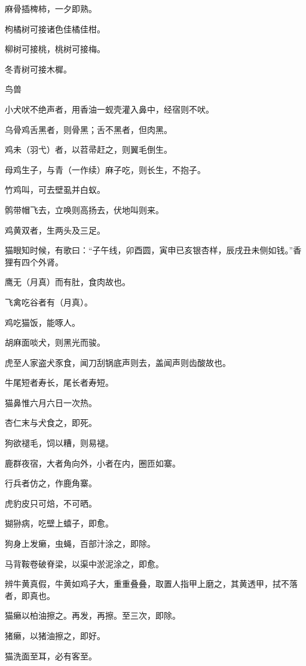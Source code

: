\documentclass[a4paper,12pt,UTF8,twoside]{ctexbook}
\begin{document}
    麻骨插椑柿，一夕即熟。
    
    枸橘树可接诸色佳橘佳柑。
    
    柳树可接桃，桃树可接梅。
    
    冬青树可接木樨。
    
    鸟兽
    
    小犬吠不绝声者，用香油一蚬壳灌入鼻中，经宿则不吠。
    
    乌骨鸡舌黑者，则骨黑；舌不黑者，但肉黑。
    
    鸡未（羽弋）者，以苕帚赶之，则翼毛倒生。
    
    母鸡生子，与青（一作续）麻子吃，则长生，不抱子。
    
    竹鸡叫，可去壁虱并白蚁。
    
    鹘带帽飞去，立唤则高扬去，伏地叫则来。
    
    鸡黄双者，生两头及三足。
    
    猫眼知时候，有歌曰：“子午线，卯酉圆，寅申已亥银杏样，辰戌丑未侧如钱。”香狸有四个外肾。
    
    鹰无（月真）而有肚，食肉故也。
    
    飞禽吃谷者有（月真）。
    
    鸡吃猫饭，能啄人。
    
    胡麻面啖犬，则黑光而骏。
    
    虎至人家盗犬豕食，闻刀刮锅底声则去，盖闻声则齿酸故也。
    
    牛尾短者寿长，尾长者寿短。
    
    猫鼻惟六月六日一次热。
    
    杏仁末与犬食之，即死。
    
    狗欲褪毛，饲以糟，则易褪。
    
    鹿群夜宿，大者角向外，小者在内，圈匝如寨。
    
    行兵者仿之，作鹿角寨。
    
    虎豹皮只可焙，不可晒。
    
    猢狲病，吃壁上蟢子，即愈。
    
    狗身上发癞，虫蝇，百部汁涂之，即除。
    
    马背鞍卷破脊梁，以渠中淤泥涂之，即愈。
    
    辨牛黄真假，牛黄如鸡子大，重重叠叠，取置人指甲上磨之，其黄透甲，拭不落者，即真也。
    
    猫癞以柏油擦之。再发，再擦。至三次，即除。
    
    猪癞，以猪油擦之，即好。
    
    猫洗面至耳，必有客至。
    
\end{document}
